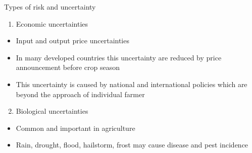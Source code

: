 \documentclass[12pt,ignorenonframetext,aspectratio=169]{beamer}
\providecommand{\tightlist}{%
  \setlength{\itemsep}{0pt}\setlength{\parskip}{0pt}}
\begin{document}
\begin{frame}{Types of risk and uncertainty}
\protect\hypertarget{types-of-risk-and-uncertainty}{}
\begin{enumerate}
\tightlist
\item
  Economic uncertainties
\end{enumerate}

\begin{itemize}
\tightlist
\item
  Input and output price uncertainties
\item
  In many developed countries this uncertainty are reduced by price
  announcement before crop season
\item
  This uncertainty is caused by national and international policies
  which are beyond the approach of individual farmer
\end{itemize}

\begin{enumerate}
\setcounter{enumi}{1}
\tightlist
\item
  Biological uncertainties
\end{enumerate}

\begin{itemize}
\tightlist
\item
  Common and important in agriculture
\item
  Rain, drought, flood, hailstorm, frost may cause disease and pest
  incidence
\end{itemize}
\end{frame}
\end{document}
